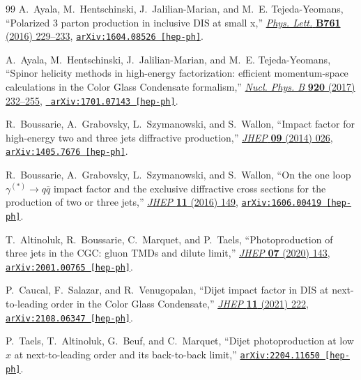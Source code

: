 \begin{thebibliography}{99}
A.~Ayala, M.~Hentschinski, J.~Jalilian-Marian, and M.~E. Tejeda-Yeomans,
  ``{Polarized 3 parton production in inclusive DIS at small x},''
  \href{http://dx.doi.org/10.1016/j.physletb.2016.08.035}{{\em Phys. Lett.}
  {\bf B761} (2016)  229--233},
\href{http://arxiv.org/abs/1604.08526}{{\tt arXiv:1604.08526 [hep-ph]}}.

A.~Ayala, M.~Hentschinski, J.~Jalilian-Marian, and M.~E. Tejeda-Yeomans,
  ``{Spinor helicity methods in high-energy factorization: efficient
  momentum-space calculations in the Color Glass Condensate formalism},''
  \href{http://dx.doi.org/10.1016/j.nuclphysb.2017.03.028}{{\em Nucl. Phys. B}
  {\bf 920} (2017)  232--255}, \href{http://arxiv.org/abs/1701.07143}{{\tt
  arXiv:1701.07143 [hep-ph]}}.

R.~Boussarie, A.~Grabovsky, L.~Szymanowski, and S.~Wallon, ``{Impact factor for
  high-energy two and three jets diffractive production},''
  \href{http://dx.doi.org/10.1007/JHEP09(2014)026}{{\em JHEP} {\bf 09} (2014)
  026}, \href{http://arxiv.org/abs/1405.7676}{{\tt arXiv:1405.7676 [hep-ph]}}.

R.~Boussarie, A.~Grabovsky, L.~Szymanowski, and S.~Wallon, ``{On the one loop $
  {\gamma}^{\left(\ast \right)}\to q\overline{q} $ impact factor and the
  exclusive diffractive cross sections for the production of two or three
  jets},'' \href{http://dx.doi.org/10.1007/JHEP11(2016)149}{{\em JHEP} {\bf 11}
  (2016)  149}, \href{http://arxiv.org/abs/1606.00419}{{\tt arXiv:1606.00419
  [hep-ph]}}.

T.~Altinoluk, R.~Boussarie, C.~Marquet, and P.~Taels, ``{Photoproduction of
  three jets in the CGC: gluon TMDs and dilute limit},''
  \href{http://dx.doi.org/10.1007/JHEP07(2020)143}{{\em JHEP} {\bf 07} (2020)
  143}, \href{http://arxiv.org/abs/2001.00765}{{\tt arXiv:2001.00765
  [hep-ph]}}.

P.~Caucal, F.~Salazar, and R.~Venugopalan, ``{Dijet impact factor in DIS at
  next-to-leading order in the Color Glass Condensate},''
  \href{http://dx.doi.org/10.1007/JHEP11(2021)222}{{\em JHEP} {\bf 11} (2021)
  222}, \href{http://arxiv.org/abs/2108.06347}{{\tt arXiv:2108.06347
  [hep-ph]}}.

P.~Taels, T.~Altinoluk, G.~Beuf, and C.~Marquet, ``{Dijet photoproduction at
  low $x$ at next-to-leading order and its back-to-back limit},''
  \href{http://arxiv.org/abs/2204.11650}{{\tt arXiv:2204.11650 [hep-ph]}}.


\end{thebibliography}
